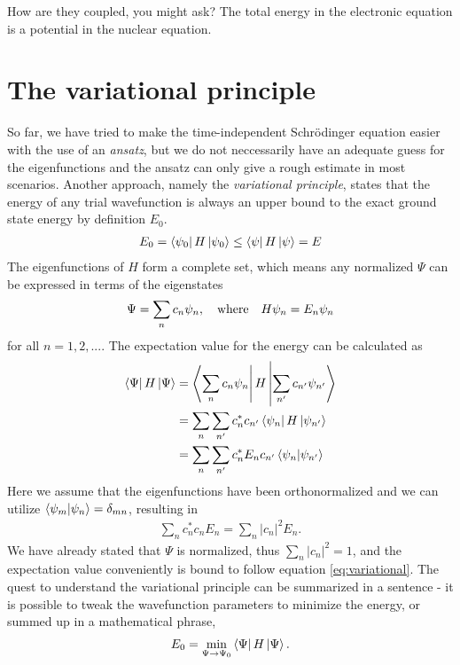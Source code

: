 How are they coupled, you might ask? The total energy in the electronic equation is a potential in the nuclear equation.

\section{The variational principle}
\label{appendix:variational-principle}
So far, we have tried to make the time-independent Schrödinger equation easier with the use of an \textit{ansatz}, but we do not neccessarily have an adequate guess for the eigenfunctions and the ansatz can only give a rough estimate in most scenarios. Another approach, namely the \textit{variational principle}, states that the energy of any trial wavefunction is always an upper bound to the exact ground state energy by definition $E_0$.
\begin{align}
  E_0 = \bra{\psi_0 } H \ket{\psi_0} \leq \bra{\psi}H\ket{\psi} = E
  \label{eq:variational}
\end{align}
The eigenfunctions of $H$ form a complete set, which means any normalized $\Psi$ can be expressed in terms of the eigenstates
\begin{align}
  \Psi = \sum_n c_n \psi_n, \quad \textnormal{where} \quad H\psi_n = E_n \psi_n
\end{align}
for all $n = 1,2, ...$. The expectation value for the energy can be calculated as
\begin{align*}
  \bra{\Psi}H\ket{\Psi} &= \bra{\sum_{n}c_n \psi_n} H \ket{\sum_{n'} c_{n'}\psi_{n'}} \\
  &= \sum_n \sum_{n'} c_{n}^* c_{n'} \bra{\psi_n}H\ket{\psi_{n'}} \\
  &= \sum_n \sum_{n'} c_{n}^* E_n c_{n'} \bra{\psi_{n}}\ket{\psi_{n'}} \\
\end{align*}
Here we assume that the eigenfunctions have been orthonormalized and we can utilize $\bra{\psi_{m}}\ket{\psi_{n}}=\delta_{mn}$, resulting in
\begin{align*}
  \sum_n c_n^*c_n E_n = \sum_n \lvert c_n \rvert^2 E_n.
\end{align*}
We have already stated that $\Psi$ is normalized, thus $\sum_n \lvert c_n \rvert ^2 = 1 $, and the expectation value conveniently is bound to follow equation \ref{eq:variational}.
The quest to understand the variational principle can be summarized in a sentence - it is possible to tweak the wavefunction parameters to minimize the energy, or summed up in a mathematical phrase,
\begin{align}
  E_0 = \min_{\Psi \rightarrow \Psi_0} \bra{\Psi}H\ket{\Psi}.
\end{align}

